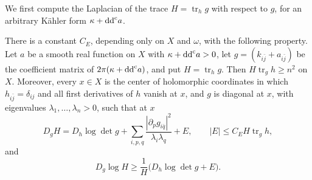We first compute the Laplacian of the trace $H=\operatorname{tr}_hg$ with respect to $g$, for an arbitrary K\"ahler form $\kappa+\mathrm{dd}^{\mathrm{c}} a$.

\begin{lemma}\label{lem:kahler-trace-laplacian}
There is a constant $C_E$, depending only on $X$ and $\omega$, with the following property. Let $a$ be a smooth real function on $X$ with $\kappa+\mathrm{dd}^{\mathrm{c}} a>0$, let $g=(k_{i\bar j}+a_{i\bar j})$ be the coefficient matrix of $2\pi(\kappa+\mathrm{dd}^{\mathrm{c}} a)$, and put $H=\operatorname{tr}_hg$. Then $H\operatorname{tr}_gh\geq n^2$ on $X$. Moreover, every $x\in X$ is the center of holomorphic coordinates in which $h_{i\bar j}=\delta_{ij}$ and all first derivatives of $h$ vanish at $x$, and $g$ is diagonal at $x$, with eigenvalues $\lambda_1,\ldots,\lambda_n>0$, such that at $x$
\begin{equation}\label{eq:penalized-trace-laplacian}
 D_gH=D_h\log\det g
       +\sum_{i,p,q}\frac{|\partial_pg_{i\bar q}|^2}{\lambda_i\lambda_q}+E,
 \qquad |E|\leq C_EH\operatorname{tr}_gh,
\end{equation}
and
\begin{equation}\label{eq:kahler-log-trace-inequality}
 D_g\log H\geq\frac1H\bigl(D_h\log\det g+E\bigr).
\end{equation}
\end{lemma}
